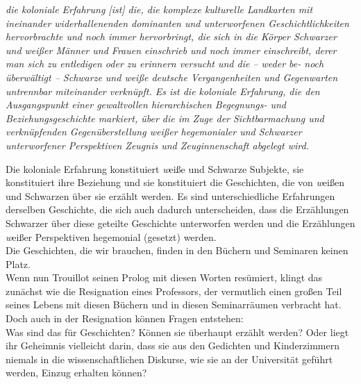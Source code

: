 \begin{myenv}
  \textit{\glqq[…] die koloniale Erfahrung [ist] die, die komplexe kulturelle
    Landkarten mit ineinander widerhallenenden dominanten und unterworfenen
    Geschichtlichkeiten hervorbrachte und noch immer hervorbringt, die sich in
    die Körper Schwarzer und weißer Männer und Frauen einschrieb und noch immer
    einschreibt, derer man sich zu entledigen oder zu erinnern versucht und die
    – weder be- noch überwältigt – Schwarze und weiße deutsche Vergangenheiten
    und Gegenwarten untrennbar miteinander verknüpft. Es ist die koloniale
    Erfahrung, die den Ausgangspunkt einer gewaltvollen hierarchischen
    Begegnungs- und Beziehungsgeschichte markiert, über die im Zuge der
    Sichtbarmachung und verknüpfenden Gegenüberstellung weißer hegemonialer und
    Schwarzer unterworfener Perspektiven Zeugnis und Zeuginnenschaft abgelegt
  wird.\grqq\footnotemark{}} \end{myenv}
Die koloniale Erfahrung konstituiert \textit{w}eiße und Schwarze Subjekte, sie
konstituiert ihre Beziehung und sie konstituiert die Geschichten, die von
\textit{w}eißen und Schwarzen über sie erzählt werden. Es sind unterschiedliche
Erfahrungen derselben Geschichte, die sich auch dadurch unterscheiden, dass die
Erzählungen Schwarzer über diese geteilte Geschichte unterworfen werden und die
Erzählungen \textit{w}eißer Perspektiven hegemonial (gesetzt) werden.\\

\noindent Die Geschichten, die wir brauchen, finden in den Büchern und Seminaren keinen
Platz.\\
Wenn nun Trouillot seinen Prolog mit diesen Worten resümiert,
klingt das zunächst wie die Resignation eines Professors, der vermutlich einen
großen Teil seines Lebens mit diesen Büchern und in diesen Seminarräumen
verbracht hat. Doch auch in der Resignation können Fragen entstehen:\\
 Was sind
das für Geschichten? Können sie überhaupt erzählt werden? Oder liegt ihr
Geheimnis vielleicht darin, dass sie aus den Gedichten und Kinderzimmern
niemals in die wissenschaftlichen Diskurse, wie sie an der Universität geführt
werden, Einzug erhalten können?\\

